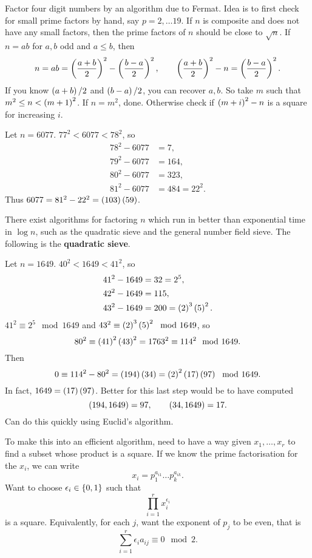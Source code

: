 Factor four digit numbers by an algorithm due to Fermat. Idea is to first check for small prime factors by hand, say $ p = 2, \dots 19 $. If $ n $ is composite and does not have any small factors, then the prime factors of $ n $ should be close to $ \sqrt{n} $. If $ n = ab $ for $ a, b $ odd and $ a \le b $, then
$$ n = ab = \left( \dfrac{a + b}{2} \right)^2 - \left( \dfrac{b - a}{2} \right)^2, \qquad \left( \dfrac{a + b}{2} \right)^2 - n = \left( \dfrac{b - a}{2} \right)^2. $$
If you know $ \left( a + b \right) / 2 $ and $ \left( b - a \right) / 2 $, you can recover $ a, b $. So take $ m $ such that $ m^2 \le n < \left( m + 1 \right)^2 $. If $ n = m^2 $, done. Otherwise check if $ \left( m + i \right)^2 - n $ is a square for increasing $ i $.

\begin{example*}
Let $ n  = 6077 $. $ 77^2 < 6077 < 78^2 $, so
\begin{align*}
78^2 - 6077 & = 7, \\
79^2 - 6077 & = 164, \\
80^2 - 6077 & = 323, \\
81^2 - 6077 & = 484 = 22^2.
\end{align*}
Thus $ 6077 = 81^2 - 22^2 = \left( 103 \right)\left( 59 \right) $.
\end{example*}

There exist algorithms for factoring $ n $ which run in better than exponential time in $ \log n $, such as the quadratic sieve and the general number field sieve. The following is the \textbf{quadratic sieve}.

\begin{example*}
Let $ n = 1649 $. $ 40^2 < 1649 < 41^2 $, so
\begin{align*}
41^2 - 1649 & = 32 = 2^5, \\
42^2 - 1649 & = 115, \\
43^2 - 1649 & = 200 = \left( 2 \right)^3\left( 5 \right)^2.
\end{align*}
$ 41^2 \equiv 2^5 \mod 1649 $ and $ 43^2 \equiv \left( 2 \right)^3\left( 5 \right)^2 \mod 1649 $, so
$$ 80^2 \equiv \left( 41 \right)^2\left( 43 \right)^2 = 1763^2 \equiv 114^2 \mod 1649. $$
Then
$$ 0 \equiv 114^2 - 80^2 = \left( 194 \right)\left( 34 \right) = \left( 2 \right)^2\left( 17 \right)\left( 97 \right) \mod 1649. $$
In fact, $ 1649 = \left( 17 \right)\left( 97 \right) $. Better for this last step would be to have computed
$$ \left( 194, 1649 \right) = 97, \qquad \left( 34, 1649 \right) = 17. $$
Can do this quickly using Euclid's algorithm.
\end{example*}

To make this into an efficient algorithm, need to have a way given $ x_1, \dots, x_r $ to find a subset whose product is a square. If we know the prime factorisation for the $ x_i $, we can write
$$ x_i = p_1^{a_{i1}} \dots p_k^{a_{ik}}. $$
Want to choose $ \epsilon_i \in \left\{ 0, 1 \right\} $ such that
$$ \prod_{i = 1}^r x_i^{\epsilon_i} $$
is a square. Equivalently, for each $ j $, want the exponent of $ p_j $ to be even, that is
$$ \sum_{i = 1}^r \epsilon_ia_{ij} \equiv 0 \mod 2. $$

